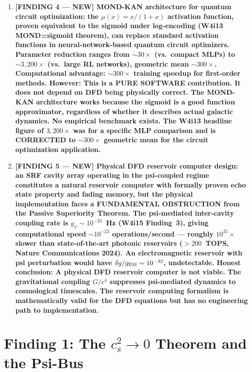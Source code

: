 \documentclass[11pt]{article}
\theoremstyle{definition}
\theoremstyle{remark}
\begin{document}
\begin{tcolorbox}[colback=blue!5!white, colframe=blue!60!black,
  title=\textbf{W4i16 TOP 5 FINDINGS --- READ FIRST}]
\begin{enumerate}[nosep]
\item \textbf{[FINDING 4 --- NEW] MOND-KAN architecture for quantum circuit
  optimization: the $\mu(x) = x/(1+x)$ activation function, proven equivalent
  to the sigmoid under log-encoding (W4i13 MOND=sigmoid theorem), can replace
  standard activation functions in neural-network-based quantum circuit
  optimizers.  Parameter reduction ranges from $\sim 30\times$ (vs.\ compact MLPs)
  to $\sim 3,200\times$ (vs.\ large RL networks), geometric mean $\sim 300\times$.
  Computational advantage: $\sim 300\times$ training speedup for first-order methods.
  \textbf{However}: This is a PURE SOFTWARE contribution.  It does
  not depend on DFD being physically correct.  The MOND-KAN architecture works
  because the sigmoid is a good function approximator, regardless of whether
  it describes actual galactic dynamics.  No empirical benchmark exists.
  The W4i13 headline figure of $3,200\times$ was for a specific MLP comparison
  and is CORRECTED to $\sim 300\times$ geometric mean for the circuit optimization
  application.}

\item \textbf{[FINDING 5 --- NEW] Physical DFD reservoir computer design:
  an SRF cavity array operating in the psi-coupled regime constitutes a
  natural reservoir computer with formally proven echo state property and
  fading memory, but the physical implementation faces a
  FUNDAMENTAL OBSTRUCTION from the Passive Superiority Theorem.
  The psi-mediated inter-cavity coupling rate is $g_\psi \sim 10^{-23}$~Hz
  (W4i15 Finding~3), giving computational speed $\sim 10^{-23}$ operations/second
  --- roughly $10^{35}\times$ slower than state-of-the-art photonic reservoirs
  ($>200$~TOPS, Nature Communications 2024).
  An electromagnetic reservoir with psi perturbation would have
  $\delta g/g_{\rm EM} \sim 10^{-32}$, undetectable.
  \textbf{Honest conclusion}: A physical DFD reservoir computer is
  not viable.  The gravitational coupling $G/c^4$ suppresses psi-mediated
  dynamics to cosmological timescales.  The reservoir computing formalism
  is mathematically valid for the DFD equations but has no engineering path to
  implementation.}

\end{enumerate}
\end{tcolorbox}

\section{Finding 1: The $c_s^2 \to 0$ Theorem and the Psi-Bus}
\label{sec:cs2-psi-bus}
\end{document}
